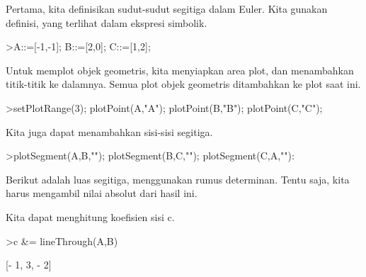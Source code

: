\documentclass[a4paper,10pt]{article}
\begin{document}
\begin{eulernotebook}
\begin{eulercomment}
\begin{eulercomment}
\begin{eulercomment}
\begin{eulercomment}
\begin{eulercomment}
\begin{eulercomment}
\begin{eulercomment}
\begin{eulercomment}
\begin{eulercomment}
\begin{eulercomment}
\begin{eulercomment}
\begin{eulercomment}
\begin{eulercomment}
\begin{eulercomment}
\begin{eulercomment}
\begin{eulercomment}
\begin{eulercomment}
\begin{eulercomment}
\begin{eulercomment}
\begin{eulercomment}
\begin{eulercomment}
\begin{eulercomment}
\begin{eulercomment}
\begin{eulercomment}
\begin{eulercomment}
\begin{eulercomment}
\begin{eulercomment}
\begin{eulercomment}
\begin{eulercomment}
\begin{eulercomment}
\begin{eulercomment}
Pertama, kita definisikan sudut-sudut segitiga dalam Euler. Kita
gunakan definisi, yang terlihat dalam ekspresi simbolik.
\end{eulercomment}
\begin{eulerprompt}
>A::=[-1,-1]; B::=[2,0]; C::=[1,2];
\end{eulerprompt}
\begin{eulercomment}
Untuk memplot objek geometris, kita menyiapkan area plot, dan
menambahkan titik-titik ke dalamnya. Semua plot objek geometris
ditambahkan ke plot saat ini.
\end{eulercomment}
\begin{eulerprompt}
>setPlotRange(3); plotPoint(A,"A"); plotPoint(B,"B"); plotPoint(C,"C");
\end{eulerprompt}
\begin{eulercomment}
Kita juga dapat menambahkan sisi-sisi segitiga.
\end{eulercomment}
\begin{eulerprompt}
>plotSegment(A,B,""); plotSegment(B,C,""); plotSegment(C,A,""):
\end{eulerprompt}
\begin{eulercomment}
Berikut adalah luas segitiga, menggunakan rumus determinan. Tentu
saja, kita harus mengambil nilai absolut dari hasil ini.
\end{eulercomment}
\begin{eulercomment}
Kita dapat menghitung koefisien sisi c.
\end{eulercomment}
\begin{eulerprompt}
>c &= lineThrough(A,B)
\end{eulerprompt}
\begin{euleroutput}
  
                              [- 1, 3, - 2]
  

\end{euleroutput}
\end{eulercomment}
\end{eulercomment}
\end{eulercomment}
\end{eulercomment}
\end{eulercomment}
\end{eulercomment}
\end{eulercomment}
\end{eulercomment}
\end{eulercomment}
\end{eulercomment}
\end{eulercomment}
\end{eulercomment}
\end{eulercomment}
\end{eulercomment}
\end{eulercomment}
\end{eulercomment}
\end{eulercomment}
\end{eulercomment}
\end{eulercomment}
\end{eulercomment}
\end{eulercomment}
\end{eulercomment}
\end{eulercomment}
\end{eulercomment}
\end{eulercomment}
\end{eulercomment}
\end{eulercomment}
\end{eulercomment}
\end{eulercomment}
\end{eulercomment}
\end{eulernotebook}
\end{document}
